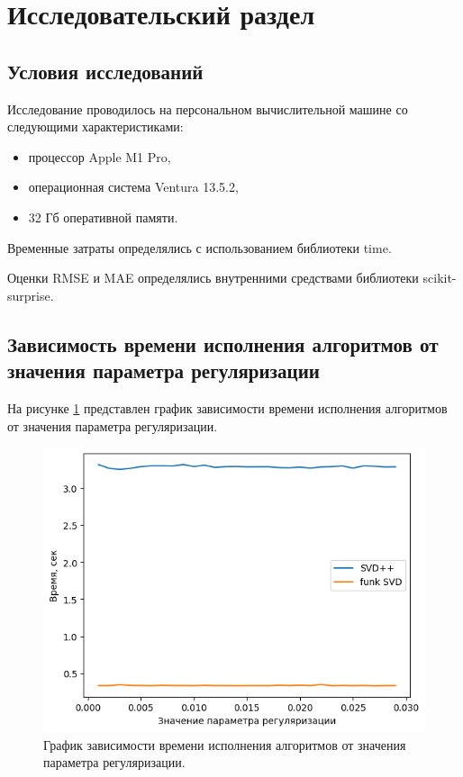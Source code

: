 \section{Исследовательский раздел}
\subsection{Условия исследований}
Исследование проводилось на персональном вычислительной машине со следующими характеристиками:

\begin{itemize}
\item процессор Apple M1 Pro,
\item операционная система Ventura 13.5.2,
\item 32 Гб оперативной памяти.
\end{itemize}

Временные затраты определялись с использованием библиотеки time.

Оценки RMSE и MAE определялись внутренними средствами библиотеки scikit-surprise.

\subsection{Зависимость времени исполнения алгоритмов от значения параметра регуляризации}

На рисунке \ref{img:time1} представлен график зависимости времени исполнения алгоритмов от значения параметра регуляризации.

\begin{figure}[H]
	\centering
	\includegraphics[width=\textwidth]{inc/timesReg.png}
	\caption{ График зависимости времени исполнения алгоритмов от значения параметра регуляризации.}
	\label{img:time1}
\end{figure}

